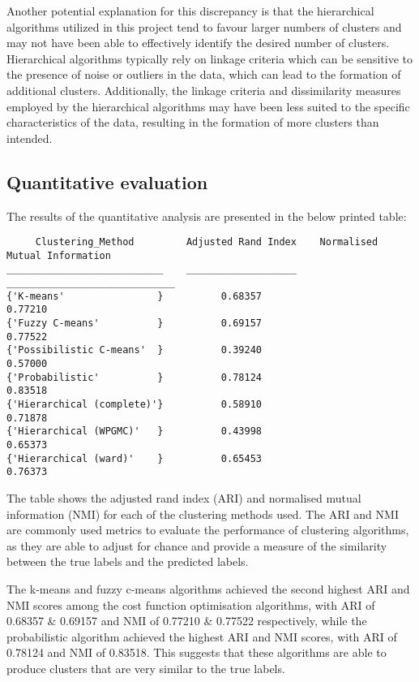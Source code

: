 \documentclass[
  course = {{DS12E Clustering Algorithms}},
  quartile = {{2}},
  assignment = ,
  name = {{Michael Darmanis ; Vasilios Venieris}},
  studentnumber = {{7115152200004 ; 7115152200017}},
  email = {{mdarm@di.uoa.gr ; vvenieris@di.uoa.gr}},
  firstexercise = 1
]{aga-homework}
\begin{document}
Another potential explanation for this discrepancy is that the hierarchical algorithms utilized in this project tend to favour larger numbers of clusters and may not have been able to effectively identify the desired number of clusters. Hierarchical algorithms typically rely on linkage criteria which can be sensitive to the presence of noise or outliers in the data, which can lead to the formation of additional clusters. Additionally, the linkage criteria and dissimilarity measures employed by the hierarchical algorithms may have been less suited to the specific characteristics of the data, resulting in the formation of more clusters than intended.

\FloatBarrier
\subsection{Quantitative evaluation}

The results of the quantitative analysis are presented in the below printed table:

\begin{verbatim}
     Clustering_Method         Adjusted Rand Index    Normalised Mutual Information
___________________________    ___________________    _____________________________
{'K-means'                }          0.68357                     0.77210           
{'Fuzzy C-means'          }          0.69157                     0.77522           
{'Possibilistic C-means'  }          0.39240                     0.57000          
{'Probabilistic'          }          0.78124                     0.83518           
{'Hierarchical (complete)'}          0.58910                     0.71878           
{'Hierarchical (WPGMC)'   }          0.43998                     0.65373           
{'Hierarchical (ward)'    }          0.65453                     0.76373  
\end{verbatim}

The table shows the adjusted rand index (ARI) and normalised mutual information (NMI) for each of the clustering methods used. The ARI and NMI are commonly used metrics to evaluate the performance of clustering algorithms, as they are able to adjust for chance and provide a measure of the similarity between the true labels and the predicted labels.

The k-means and fuzzy c-means algorithms achieved the second highest ARI and NMI scores among the cost function optimisation algorithms, with ARI of 0.68357 \& 0.69157 and NMI of 0.77210 \& 0.77522 respectively, while the probabilistic algorithm achieved the highest ARI and NMI scores, with ARI of 0.78124 and NMI of 0.83518. This suggests that these algorithms are able to produce clusters that are very similar to the true labels.
\end{document}
